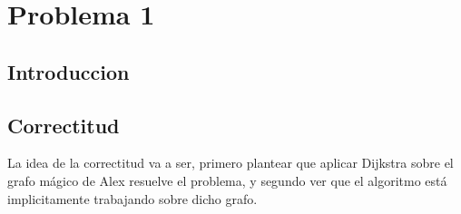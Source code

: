 
\section{Problema 1}


\subsection{Introduccion}
\subsection{Correctitud}
La idea de la correctitud va a ser, primero plantear que aplicar Dijkstra sobre el grafo mágico de Alex resuelve el problema, y segundo ver que el algoritmo está implicitamente trabajando sobre dicho grafo.


